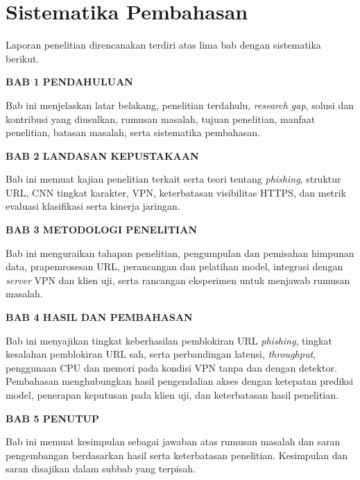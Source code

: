 \section{Sistematika Pembahasan}

Laporan penelitian direncanakan terdiri atas lima bab dengan sistematika berikut.

\noindent\textbf{BAB 1 PENDAHULUAN}

Bab ini menjelaskan latar belakang, penelitian terdahulu, \textit{research gap}, solusi dan kontribusi yang diusulkan, rumusan masalah, tujuan penelitian, manfaat penelitian, batasan masalah, serta sistematika pembahasan.

\noindent\textbf{BAB 2 LANDASAN KEPUSTAKAAN}

Bab ini memuat kajian penelitian terkait serta teori tentang \textit{phishing}, struktur URL, CNN tingkat karakter, VPN, keterbatasan visibilitas HTTPS, dan metrik evaluasi klasifikasi serta kinerja jaringan.

\noindent\textbf{BAB 3 METODOLOGI PENELITIAN}

Bab ini menguraikan tahapan penelitian, pengumpulan dan pemisahan himpunan data, prapemrosesan URL, perancangan dan pelatihan model, integrasi dengan \textit{server} VPN dan klien uji, serta rancangan eksperimen untuk menjawab rumusan masalah.

\noindent\textbf{BAB 4 HASIL DAN PEMBAHASAN}

Bab ini menyajikan tingkat keberhasilan pemblokiran URL \textit{phishing}, tingkat kesalahan pemblokiran URL sah, serta perbandingan latensi, \textit{throughput}, penggunaan CPU dan memori pada kondisi VPN tanpa dan dengan detektor. Pembahasan menghubungkan hasil pengendalian akses dengan ketepatan prediksi model, penerapan keputusan pada klien uji, dan keterbatasan hasil penelitian.

\noindent\textbf{BAB 5 PENUTUP}

Bab ini memuat kesimpulan sebagai jawaban atas rumusan masalah dan saran pengembangan berdasarkan hasil serta keterbatasan penelitian. Kesimpulan dan saran disajikan dalam subbab yang terpisah.
